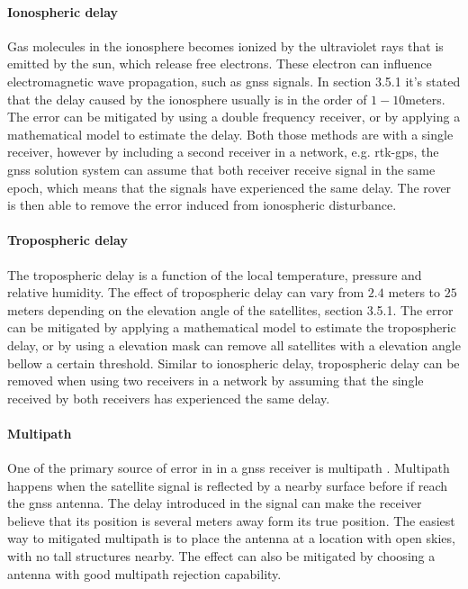 \paragraph{Ionospheric delay}
Gas molecules in the ionosphere becomes ionized by the ultraviolet rays that is emitted by the sun, which release free electrons. These electron can influence electromagnetic wave propagation, such as \gls{gnss} signals. In \citep{vik2014integrated} section 3.5.1 it's stated that the delay caused by the ionosphere usually is in the order of $1-10 $meters. The error can be mitigated by using a double frequency receiver, or by applying a mathematical model to estimate the delay. Both those methods are with a single receiver, however by including a second receiver in a network, e.g. \gls{rtk-gps}, the \gls{gnss} solution system can assume that both receiver receive signal in the same epoch, which means that the signals have experienced the same delay. The rover is then able to remove the error induced from ionospheric disturbance.
\paragraph{Tropospheric delay}
The tropospheric delay is a function of the local temperature, pressure and relative humidity. The effect of tropospheric delay can  vary from $2.4$ meters to $25$ meters depending on the elevation angle of the satellites,\citep{vik2014integrated} section 3.5.1. The error can be mitigated by applying a mathematical model to estimate the tropospheric delay, or by using a elevation mask can remove all satellites with a elevation angle bellow a certain threshold. Similar to ionospheric delay, tropospheric delay can be removed when using two receivers in a network by assuming that the single received by both receivers has experienced the same delay. 

\paragraph{Multipath}
One of the primary source of error in in a \gls{gnss} receiver is multipath \citep{misra2011global}. Multipath happens when the satellite signal is reflected by a nearby surface before if reach the \gls{gnss} antenna. The delay introduced in the signal can make the receiver believe that its position is several meters away form its true position. The easiest way to mitigated multipath is to place the antenna at a location with open skies, with no tall structures nearby. The effect can also be mitigated by choosing a antenna with good multipath rejection capability.

